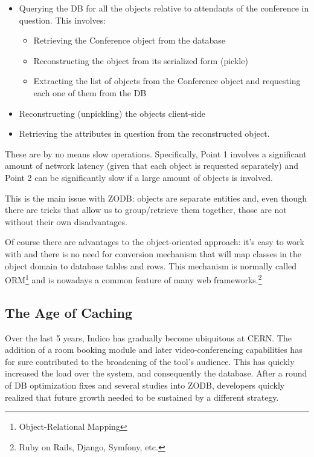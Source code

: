\begin{itemize}
  \item Querying the DB for all the objects relative to attendants of the conference in question. This involves:

  \begin{itemize}
    \item Retrieving the Conference object from the database
    \item Reconstructing the object from its serialized form (pickle)
    \item Extracting the list of objects from the Conference object and requesting each one of them from the DB
  \end{itemize}
  \item Reconstructing (unpickling) the objects client-side
  \item Retrieving the attributes in question from the reconstructed object.
\end{itemize}

These are by no means slow operations. Specifically, Point 1 involves a significant amount of network latency (given that each object is requested separately) and Point 2 can be significantly slow if a large amount of objects is involved.

This is the main issue with \textsc{ZODB}: objects are separate entities and, even though there are tricks that allow us to group/retrieve them together, those are not without their own disadvantages.

Of course there are advantages to the object-oriented approach: it's easy to work with and there is no need for conversion mechanism that will map classes in the object domain to database tables and rows. This mechanism is normally called \textsc{ORM}\footnote{Object-Relational Mapping} and is nowadays a common feature of many web frameworks.\footnote{Ruby on Rails, Django, Symfony, etc.}

\subsection{The Age of Caching}

Over the last 5 years, Indico has gradually become ubiquitous at \textsc{CERN}. The addition of a room booking module and later video-conferencing capabilities has for sure contributed to the broadening of the tool's audience. This has quickly increased the load over the system, and consequently the database. After a round of DB optimization fixes and several studies into \textsc{ZODB}, developers quickly realized that future growth needed to be sustained by a different strategy.

